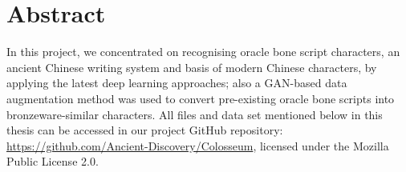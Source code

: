 \chapter*{Abstract}\label{ch:abstract}
In this project, we concentrated on recognising oracle bone script characters, an ancient Chinese writing system and basis of modern Chinese characters, by applying the latest deep learning approaches; also a GAN-based data augmentation method was used to convert pre-existing oracle bone scripts into bronzeware-similar characters. All files and data set mentioned below in this thesis can be accessed in our project GitHub repository: \url{https://github.com/Ancient-Discovery/Colosseum}, licensed under the Mozilla Public License 2.0.